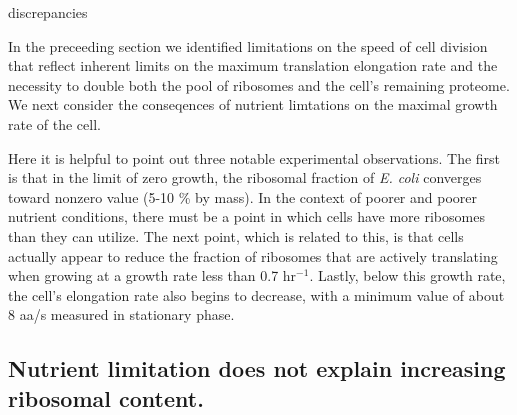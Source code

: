discrepancies \documentclass[11pt, letterpaper]{article}
\begin{document}

In the preceeding section we identified limitations on the speed of cell
division that reflect inherent limits on the maximum translation elongation rate
and the necessity to double both the pool of ribosomes and the cell's remaining
proteome. We next consider the conseqences of nutrient limtations on the maximal
growth rate of the cell.

Here it is helpful to point out three notable experimental observations.  The
first is that in the limit of zero growth, the ribosomal fraction of {\it E.
coli} converges toward nonzero value (5-10 \% by mass). In the context of poorer
and poorer nutrient conditions, there must be a point in which cells have more
ribosomes than they can utilize. The next point, which is related to this,  is
that cells actually appear to reduce the fraction of ribosomes that are actively
translating when growing at a growth rate less than 0.7 hr$^{-1}$. Lastly, below this
growth rate, the cell's elongation rate also begins to decrease, with a minimum value of about 8
aa/s measured in stationary phase.



\subsection{Nutrient limitation does not explain increasing ribosomal content.}
\end{document}
